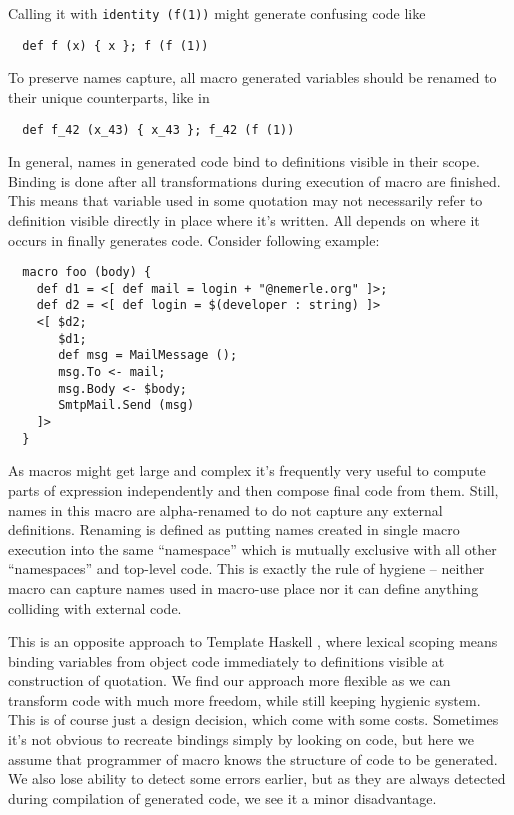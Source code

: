 \documentclass{llncs}
\begin{document}
Calling it with \verb,identity (f(1)), might generate confusing code like

\begin{verbatim}
  def f (x) { x }; f (f (1))
\end{verbatim}

To preserve names capture, all macro generated variables should be renamed 
to their unique counterparts, like in

\begin{verbatim}
  def f_42 (x_43) { x_43 }; f_42 (f (1))
\end{verbatim}

In general, names in generated code bind to definitions visible in their scope.
Binding is done after all transformations during execution of macro are finished.
This means that variable used in some quotation may not necessarily refer 
to definition visible directly in place where it's written. All depends on
where it occurs in finally generates code. Consider following example:

\begin{verbatim}
  macro foo (body) {
    def d1 = <[ def mail = login + "@nemerle.org" ]>;
    def d2 = <[ def login = $(developer : string) ]>
    <[ $d2;
       $d1;
       def msg = MailMessage ();
       msg.To <- mail;
       msg.Body <- $body;
       SmtpMail.Send (msg)
    ]>
  }
\end{verbatim}

As macros might get large and complex it's frequently very
useful to compute parts of expression independently and then compose
final code from them. Still, names in this macro are alpha-renamed to
do not capture any external definitions. Renaming is defined as putting
names created in single macro execution into the same ``namespace'' which is
mutually exclusive with all other ``namespaces'' and top-level code.
This is exactly the rule of hygiene -- neither macro can capture names
used in macro-use place nor it can define anything colliding with external
code. 

This is an opposite approach to Template Haskell \cite{Haskell:Meta}, 
where lexical scoping means binding variables from object code immediately 
to definitions visible at construction of quotation.
We find our approach more flexible as we can transform code with much
more freedom, while still keeping hygienic system. This is of course just a
design decision, which come with some costs. Sometimes it's not obvious to
recreate bindings simply by looking on code, but here we assume that programmer
of macro knows the structure of code to be generated. We also lose ability to 
detect some errors earlier, but as they are always detected during compilation of 
generated code, we see it a minor disadvantage. 
\end{document}
